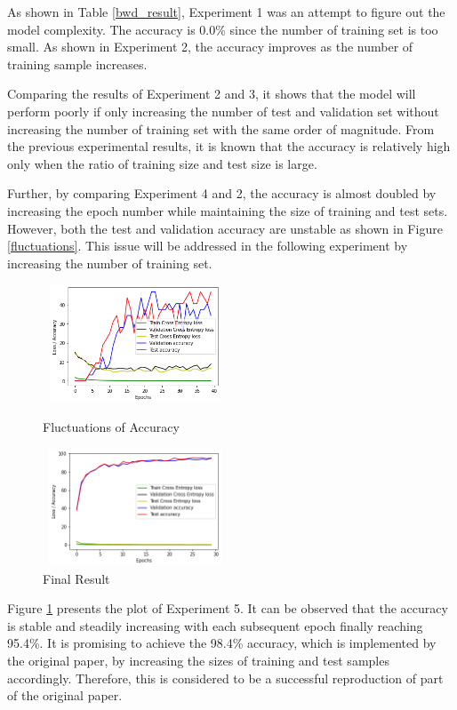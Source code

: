 \documentclass{article} %
\begin{document}
As shown in Table \ref{bwd_result}, Experiment 1 was an attempt to figure out the model complexity. The accuracy is 0.0\% since the number of training set is too small. As shown in Experiment 2, the accuracy improves as the number of training sample increases.

Comparing the results of Experiment 2 and 3, it shows that the model will perform poorly if only increasing the number of test and validation set without increasing the number of training set with the same order of magnitude. From the previous experimental results, it is known that the accuracy is relatively high only when the ratio of training size and test size is large.

Further, by comparing Experiment 4 and 2, the accuracy is almost doubled by increasing the epoch number while maintaining the size of training and test sets. However, both the test and validation accuracy are unstable as shown in Figure \ref{fluctuations}. This issue will be addressed in the following experiment by increasing the number of training set.

\begin{figure}[h]
\begin{minipage}[t]{0.45\linewidth}
\centering
\includegraphics[width=5.5cm,height=3.5cm]{figures/F1.png}
\caption{Fluctuations of Accuracy}
\label{fluctuations}
\end{minipage}
\begin{minipage}[t]{0.45\linewidth}
\hspace{15pt}
\includegraphics[width=5.5cm,height=3.5cm]{figures/F2.png}
\caption{Final Result}
\label{finalResult}
\end{minipage}
\end{figure}

Figure \ref{finalResult} presents the plot of Experiment 5. It can be observed that the accuracy is stable and steadily increasing with each subsequent epoch finally reaching 95.4\%. It is promising to achieve the 98.4\% accuracy, which is implemented by the original paper, by increasing the sizes of training and test samples accordingly. Therefore, this is considered to be a successful reproduction of part of the original paper.
\end{document}

